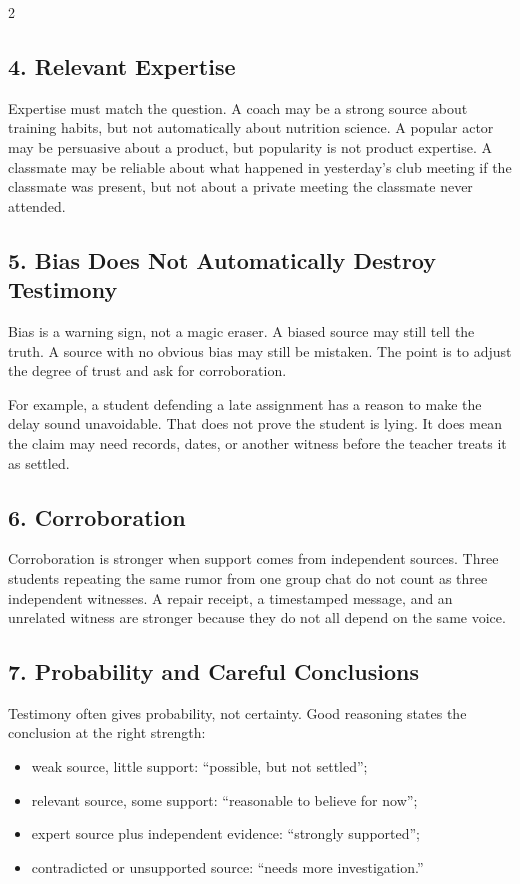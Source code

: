 \documentclass[12pt]{article}
\begin{document}
\begin{multicols}{2}
\subsection*{4. Relevant Expertise}
Expertise must match the question. A coach may be a strong source about training habits, but not automatically about nutrition science. A popular actor may be persuasive about a product, but popularity is not product expertise. A classmate may be reliable about what happened in yesterday's club meeting if the classmate was present, but not about a private meeting the classmate never attended.

\subsection*{5. Bias Does Not Automatically Destroy Testimony}
Bias is a warning sign, not a magic eraser. A biased source may still tell the truth. A source with no obvious bias may still be mistaken. The point is to adjust the degree of trust and ask for corroboration.

For example, a student defending a late assignment has a reason to make the delay sound unavoidable. That does not prove the student is lying. It does mean the claim may need records, dates, or another witness before the teacher treats it as settled.

\subsection*{6. Corroboration}
Corroboration is stronger when support comes from independent sources. Three students repeating the same rumor from one group chat do not count as three independent witnesses. A repair receipt, a timestamped message, and an unrelated witness are stronger because they do not all depend on the same voice.

\subsection*{7. Probability and Careful Conclusions}
Testimony often gives probability, not certainty. Good reasoning states the conclusion at the right strength:
\begin{itemize}[leftmargin=*]
\item weak source, little support: ``possible, but not settled'';
\item relevant source, some support: ``reasonable to believe for now'';
\item expert source plus independent evidence: ``strongly supported'';
\item contradicted or unsupported source: ``needs more investigation.''
\end{itemize}


\end{multicols}
\end{document}
